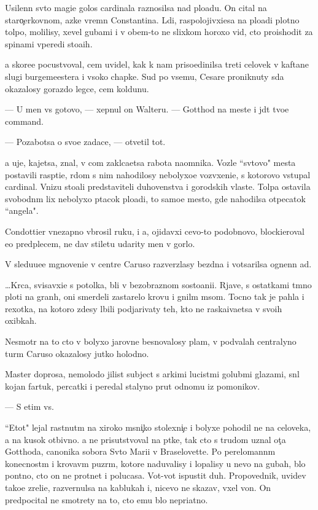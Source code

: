 \documentclass[10pt]{book}
\begin{document}
Usilenn{\yi}{\y} sv{\ia}to{\y} magi{\y}e{\y} golos cardinala raznosilsa nad plo{\x}ad{\y}u. On cital na staro{\c}erkovnom, {\y}az{\yi}ke vrem{\e}n Constantina. L{\io}di, raspolojivxi{\y}esa na plo{\x}adi plotno{\y} tolpo{\y}, molilisy, xevel{\ia} gubami i v ob{\x}em-to ne slixkom horoxo vid{\ia}, cto proishodit za spinami vperedi sto{\y}a{\x}ih.

{\Y}a skore{\y}e pocustvoval, cem uvidel, kak k nam priso{\y}edinilsa treti{\y} celovek v kaftane slugi burgemeestera i v{\yi}soko{\y} chapke. Sud{\ia} po vsemu, Cesare proniknuty s{\io}da okazalosy gorazdo legce, cem koldunu.

— U men{\ia} vs{\e} gotovo, — xepnul on Walteru. — Gotthod na meste i jd{\e}t tvo{\y}e{\y} command{\yi}.

— Pozabotsa o svo{\y}e{\y} zadace, — otvetil tot.

{\Y}a uje, kajetsa, znal, v com zakl{\io}ca{\y}etsa rabota na{\y}omnika. Vozle ``sv{\ia}tovo" mesta postavili rasp{\ia}ti{\y}e, r{\ia}dom s nim nahodilosy nebolyxo{\y}e vozv{\yi}xeni{\y}e, s kotorovo v{\yi}stupal cardinal. Vnizu sto{\y}ali predstaviteli duhovenstva i gorodskih vlaste{\y}. Tolpa ostavila svobodn{\yi}m lix nebolyxo{\y} p{\ia}tacok plo{\x}adi, to samo{\y}e mesto, gde nahodilsa otpecatok ``angela".

Condottier vnezapno v{\yi}brosil ruku, i {\y}a, ojidavxi{\y} cevo-to podobnovo, blockieroval {\y}e{\y}o predplec{\y}em, ne dav stiletu udarity men{\ia} v gorlo.

V sledu{\y}u{\x}e{\y}e mgnoveni{\y}e v centre Caruso razverzlasy bezdna i votsarilsa ognenn{\yi}{\y} ad.



…Kr{\io}c{\y}a, svisavxi{\y}e s potolka, b{\yi}li v bezobraznom sosto{\y}ani{\y}i. Rjav{\yi}{\y}e, s ostatkami t{\e}mno{\y} ploti na gran{\ia}h, oni smerdeli zastarelo{\y} krov{\y}u i gnil{\yi}m m{\ia}som. Tocno tak je pahla i rexotka, na kotoro{\y} zdesy l{\io}bili podjarivaty teh, kto ne raska{\y}iva{\y}etsa v svo{\y}ih oxibkah.

Nesmotr{\ia} na to cto v bolyxo{\y} jarovne besnovalosy plam{\ia}, v podvalah centralyno{\y} turm{\yi} Caruso okazalosy jutko holodno.

Master doprosa, nemolodo{\y} jilist{\yi}{\y} subject s {\y}arkimi lucist{\yi}mi golub{\yi}mi glazami, sn{\ia}l kojan{\yi}{\y} fartuk, percatki i peredal stalyno{\y} prut odnomu iz pomo{\x}nikov.

— S etim vs{\e}.

``Etot" lejal rast{\ia}nut{\yi}m na xiroko{\y} m{\ia}sni{\c}ko{\y} stolexni{\c}e i bolyxe pohodil ne na celoveka, a na kusok otbivno{\y}. {\Y}a ne prisutstvoval na p{\yi}tke, tak cto s trudom uznal ot{\c}a Gotthoda, canonika sobora Sv{\ia}to{\y} Mari{\y}i v Braselovette. Po perelomann{\yi}m konecnost{\ia}m i krovav{\yi}m puz{\yi}r{\ia}m, kotor{\yi}{\y}e naduvalisy i lopalisy u nevo na gubah, b{\yi}lo pon{\ia}tno, cto on ne prot{\ia}net i polucasa. Vot-vot ispustit duh. Propovednik, uvidev tako{\y}e zreli{\x}e, razvernulsa na kablukah i, nicevo ne skazav, v{\yi}xel von. On predpocital ne smotrety na to, cto {\y}emu b{\yi}lo nepri{\y}atno.
\end{document}
